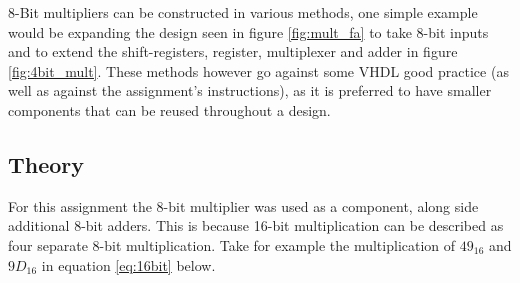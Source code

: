 \documentclass[11pt]{article}
\begin{document}
8-Bit multipliers can be constructed in various methods, one simple example would be expanding the design seen in figure \ref{fig:mult_fa} to take 8-bit inputs and to extend the shift-registers, register, multiplexer and adder in figure \ref{fig:4bit_mult}.
These methods however go against some VHDL good practice (as well as against the assignment's instructions),
as it is preferred to have smaller components that can be reused throughout a design.

\subsection{Theory}


For this assignment the 8-bit multiplier was used as a component, along side additional 8-bit adders. 
This is because 16-bit multiplication can be described as four separate 8-bit multiplication.
Take for example the multiplication of $49_16$ and $9D_16$ in equation \ref{eq:16bit} below.
\end{document}
